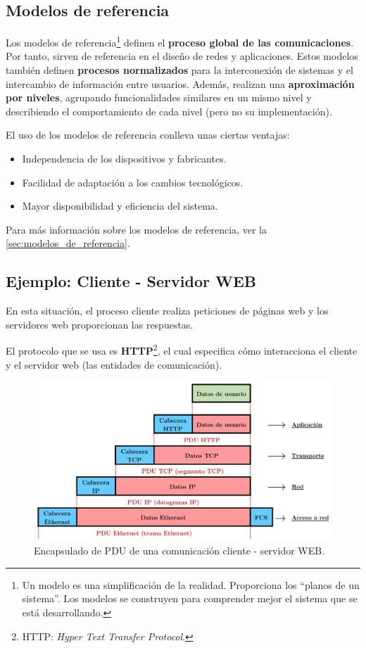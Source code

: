 \documentclass[a4paper]{book}
\begin{document}
\subsection{Modelos de referencia}

Los modelos de referencia\footnote{Un modelo es una simplificación de la realidad. Proporciona los ``planos de un sistema''. Los modelos se construyen para comprender mejor el sistema que se está desarrollando.} definen el \textbf{proceso global de las comunicaciones}. Por tanto, sirven de referencia en el diseño de redes y aplicaciones. Estos modelos también definen \textbf{procesos normalizados} para la interconexión de sistemas y el intercambio de información entre usuarios. Además, realizan una \textbf{aproximación por niveles}, agrupando funcionalidades similares en un mismo nivel y describiendo el comportamiento de cada nivel (pero no su implementación).

El uso de los modelos de referencia conlleva unas ciertas ventajas:
\begin{itemize}
  \item Independencia de los dispositivos y fabricantes.
  \item Facilidad de adaptación a los cambios tecnológicos.
  \item Mayor disponibilidad y eficiencia del sistema.
\end{itemize}

Para más información sobre los modelos de referencia, ver la \autoref{sec:modelos_de_referencia}.

\subsection{Ejemplo: Cliente - Servidor WEB}
En esta situación, el proceso cliente realiza peticiones de páginas web y los servidores web proporcionan las respuestas.

El protocolo que se usa es \textbf{HTTP}\footnote{HTTP: \textsl{Hyper Text Transfer Protocol}.}, el cual especifica cómo interacciona el cliente y el servidor web (las entidades de comunicación).

\begin{figure}[ht!]
  \centering
  \includegraphics[width=\linewidth]{./Imágenes/aaa.jpg}
  \caption{Encapsulado de PDU de una comunicación cliente - servidor WEB.}
\end{figure}
\end{document}
